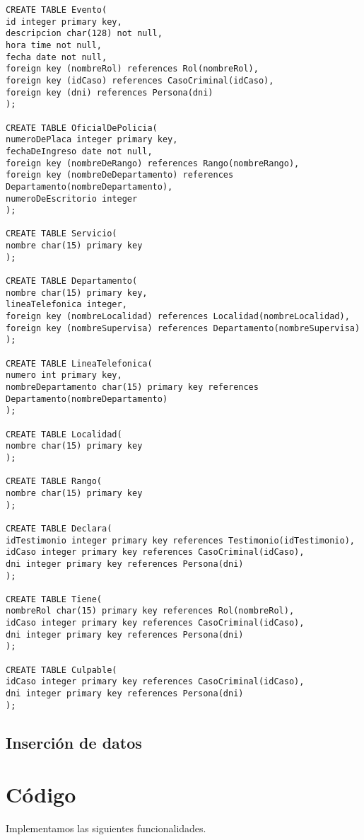 \documentclass[10pt,a4paper]{article}
\begin{document}
\begin{verbatim}
CREATE TABLE Evento(
id integer primary key,
descripcion char(128) not null,
hora time not null,
fecha date not null,
foreign key (nombreRol) references Rol(nombreRol),
foreign key (idCaso) references CasoCriminal(idCaso),
foreign key (dni) references Persona(dni)
);

CREATE TABLE OficialDePolicia(
numeroDePlaca integer primary key,
fechaDeIngreso date not null,
foreign key (nombreDeRango) references Rango(nombreRango),
foreign key (nombreDeDepartamento) references Departamento(nombreDepartamento),
numeroDeEscritorio integer
);

CREATE TABLE Servicio(
nombre char(15) primary key
);

CREATE TABLE Departamento(
nombre char(15) primary key,
lineaTelefonica integer,
foreign key (nombreLocalidad) references Localidad(nombreLocalidad),
foreign key (nombreSupervisa) references Departamento(nombreSupervisa)
);

CREATE TABLE LineaTelefonica(
numero int primary key,
nombreDepartamento char(15) primary key references Departamento(nombreDepartamento)
);

CREATE TABLE Localidad(
nombre char(15) primary key
);

CREATE TABLE Rango(
nombre char(15) primary key
);

CREATE TABLE Declara(
idTestimonio integer primary key references Testimonio(idTestimonio),
idCaso integer primary key references CasoCriminal(idCaso),
dni integer primary key references Persona(dni)
);

CREATE TABLE Tiene(
nombreRol char(15) primary key references Rol(nombreRol),
idCaso integer primary key references CasoCriminal(idCaso),
dni integer primary key references Persona(dni)
);

CREATE TABLE Culpable( 
idCaso integer primary key references CasoCriminal(idCaso),
dni integer primary key references Persona(dni)
);
\end{verbatim}
\subsection{Inserción de datos}

\section{Código}
Implementamos las siguientes funcionalidades.
\end{document}
